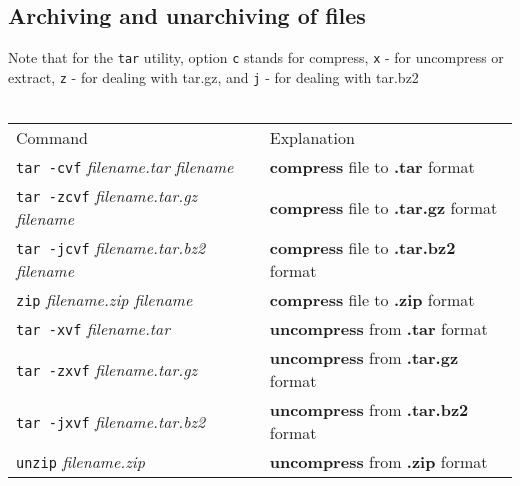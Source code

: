\subsection{Archiving and unarchiving of files}
Note that for the \texttt{tar} utility, option \texttt{c} stands for compress, 
\texttt{x} - for uncompress or extract, \texttt{z} - for dealing with tar.gz,
and \texttt{j} - for dealing with tar.bz2\\~\\
\begin{tabular}{ll}
  Command & Explanation \\
  \hhline{==}
  \texttt{tar -cvf} \textit{filename.tar} \textit{filename} & \textbf{compress} file to \textbf{.tar} format \\
  \texttt{tar -zcvf} \textit{filename.tar.gz} \textit{filename} & \textbf{compress} file to \textbf{.tar.gz} format \\
  \texttt{tar -jcvf} \textit{filename.tar.bz2} \textit{filename} & \textbf{compress} file to \textbf{.tar.bz2} format \\
  \texttt{zip} \textit{filename.zip filename} & \textbf{compress} file to \textbf{.zip} format \\
  \texttt{tar -xvf} \textit{filename.tar} & \textbf{uncompress} from \textbf{.tar} format \\
  \texttt{tar -zxvf} \textit{filename.tar.gz} & \textbf{uncompress} from \textbf{.tar.gz} format \\
  \texttt{tar -jxvf} \textit{filename.tar.bz2} & \textbf{uncompress} from \textbf{.tar.bz2} format \\
  \texttt{unzip} \textit{filename.zip} & \textbf{uncompress} from \textbf{.zip} format \\
\end{tabular}


